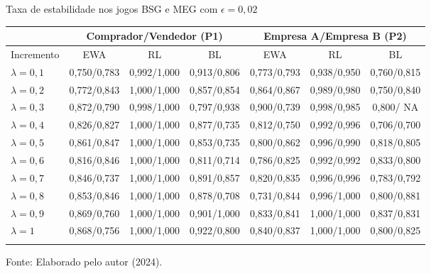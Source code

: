 \begin{tabela}[H]
	\small
	\centering
	\caption{Taxa de estabilidade nos jogos BSG e MEG com $\epsilon = 0,02$}
	\begin{tabular}{l|c c c|c c c}
		\Xhline{2\arrayrulewidth}
		& \multicolumn{3}{c|}{Comprador/Vendedor (P1)} & \multicolumn{3}{c}{Empresa A/Empresa B (P2)} \\ 
		\hline
		Incremento & EWA & RL & BL & EWA & RL & BL \\ \hline
		$\lambda = 0,1$ & 0,750/0,783 & 0,992/1,000 & 0,913/0,806 & 0,773/0,793 & 0,938/0,950 & 0,760/0,815 \\
		$\lambda = 0,2$ & 0,772/0,843 & 1,000/1,000 & 0,857/0,854 & 0,864/0,867 & 0,989/0,980 & 0,750/0,840 \\
		$\lambda = 0,3$ & 0,872/0,790 & 0,998/1,000 & 0,797/0,938 & 0,900/0,739 & 0,998/0,985 & 0,800/  NA \\
		$\lambda = 0,4$ & 0,826/0,827 & 1,000/1,000 & 0,877/0,735 & 0,812/0,750 & 0,992/0,996 & 0,706/0,700 \\
		$\lambda = 0,5$ & 0,861/0,847 & 1,000/1,000 & 0,853/0,735 & 0,800/0,862 & 0,996/0,990 & 0,818/0,805 \\
		$\lambda = 0,6$ & 0,816/0,846 & 1,000/1,000 & 0,811/0,714 & 0,786/0,825 & 0,992/0,992 & 0,833/0,800 \\
		$\lambda = 0,7$ & 0,846/0,737 & 1,000/1,000 & 0,891/0,857 & 0,820/0,835 & 0,996/0,996 & 0,783/0,792 \\
		$\lambda = 0,8$ & 0,853/0,846 & 1,000/1,000 & 0,878/0,708 & 0,731/0,844 & 0,996/1,000 & 0,800/0,881 \\
		$\lambda = 0,9$ & 0,869/0,760 & 1,000/1,000 & 0,901/1,000 & 0,833/0,841 & 1,000/1,000 & 0,837/0,831 \\
		$\lambda = 1$ & 0,868/0,756 & 1,000/1,000 & 0,922/0,800 & 0,840/0,837 & 1,000/1,000 & 0,800/0,825 \\
		\Xhline{2\arrayrulewidth}
	\end{tabular}
	\label{tabela_12}
	\caption*{\fontsize{10}{12}\selectfont Fonte: Elaborado pelo autor (2024).}
\end{tabela}
